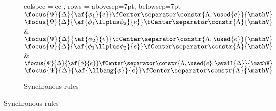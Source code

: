 \begin{figure}[h!]
	\ContinuedFloat
	\begin{subfigure}{\textwidth}
		\centering
		\begin{tblr}{ colspec = { cc } 
			    , rows = {abovesep=7pt, belowsep=7pt}
			    }
			 {\footnotesize
			\LeftLabel{$[\llten]$}
			\DP}
			\\ 
			{\footnotesize
			\AX$\focus{\Psi}{\Delta}{\af{\phi_1}{e}} \fCenter \separator \constr{\Lambda, \used{e}}{\mathV}$
			\LeftLabel{$[\llplus_L]$}
			\UI$\focus{\Psi}{\Delta}{\af{\phi_1 \llplus \phi_2}{e}} \fCenter \separator \constr{\Lambda}{\mathV}$
			\DP}
			&
			{\footnotesize
			\AX$\focus{\Psi}{\Delta}{\af{\phi_2}{e}} \fCenter \separator \constr{\Lambda, \used{e}}{\mathV}$
			\LeftLabel{$[\llplus_R]$}
			\UI$\focus{\Psi}{\Delta}{\af{\phi_1 \llplus \phi_2}{e}} \fCenter \separator \constr{\Lambda}{\mathV}$
			\DP}
			\\
			{\footnotesize
			\LeftLabel{$[1]$}
			\DP} 
			&
			{\footnotesize
			\AX$\focus{\Psi}{\Delta}{\af{\phi}{e}} \fCenter \separator \constr{\Lambda, \used{e}, \avail{\Delta}}{\mathV}$
			\LeftLabel{$[\,!\,]$}
			\UI$\focus{\Psi}{\Delta}{\af{\llbang{\phi}}{e}} \fCenter \separator \constr{\Lambda}{\mathV}$
			\DP
			}
			\\
			 {\footnotesize
			\LeftLabel{$[R\!\Downarrow]$}
			\DP
			}
		\end{tblr}
		\caption{Synchronous rules}
	\end{subfigure}
\end{figure}

